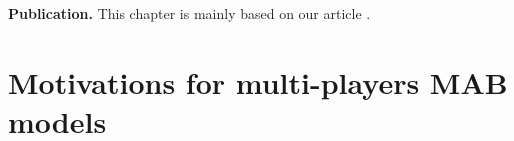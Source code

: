 \textbf{Publication.}
%
This chapter is mainly based on our article \cite{Besson2018ALT}.


\section{Motivations for multi-players MAB models}
\label{sec:5:motivation}






